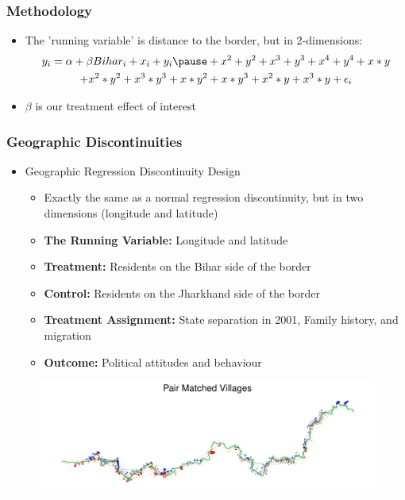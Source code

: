 \documentclass[xcolor=x11names,compress]{beamer}\usepackage[]{graphicx}\usepackage[]{color}
\makeatletter
\def\maxwidth{ %
  \ifdim\Gin@nat@width>\linewidth
    \linewidth
  \else
    \Gin@nat@width
  \fi
}
\renewcommand{\(}{\begin{columns}}
\renewcommand{\)}{\end{columns}}
\newcommand{\<}[1]{\begin{column}{#1}}
\renewcommand{\>}{\end{column}}
\makeatother
\begin{document}
\begin{frame}
\frametitle{Methodology}
\begin{itemize}
\item The 'running variable' is distance to the border, but in 2-dimensions:
\begin{multline}
y_i = \alpha + \beta Bihar_i + x_i + y_i \pause + x^2 + y^2 + x^3 + y^3 + x^4 + y^4 + x*y  \\+ x^2*y^2 + x^3*y^3 + x*y^2 + x*y^3 + x^2*y + x^3*y + \epsilon_i
\end{multline}
\item $\beta$ is our treatment effect of interest
\end{itemize}
\end{frame}

\begin{frame}
\frametitle{Geographic Discontinuities}
\begin{itemize}
\item Geographic Regression Discontinuity Design
\begin{itemize}
\item Exactly the same as a normal regression discontinuity, but in two dimensions (longitude and latitude)
\pause
\item \textbf{The Running Variable:} \pause Longitude and latitude
\pause 
\item \textbf{Treatment:} \pause Residents on the Bihar side of the border
\pause 
\item \textbf{Control:} \pause Residents on the Jharkhand side of the border
\pause 
\item \textbf{Treatment Assignment:} \pause State separation in 2001, Family history, and migration
\pause 
\item \textbf{Outcome:} \pause Political attitudes and behaviour
\end{itemize}
\end{itemize}
\end{frame}

\begin{frame}
\begin{figure}
\includegraphics[width=\maxwidth]{figure/Map_Border-1.pdf}
\end{figure}
\end{frame}
\end{document}
